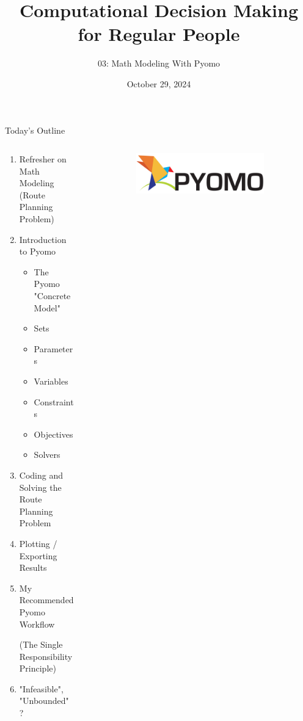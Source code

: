\documentclass[10pt, aspectratio=169]{beamer}
\title{Computational Decision Making for Regular People}
\subtitle{03: Math Modeling With Pyomo}
\date{October 29, 2024}
\begin{document}
\begin{frame}
    \maketitle
\end{frame}

\begin{frame}{Today's Outline}
    \begin{columns}
        \begin{column}{0.5\textwidth}
            \begin{enumerate}
                \item Refresher on Math Modeling (Route Planning Problem)
                \item Introduction to Pyomo
                \begin{itemize}
                    \item The Pyomo "ConcreteModel"
                    \item Sets
                    \item Parameters
                    \item Variables
                    \item Constraints
                    \item Objectives
                    \item Solvers
                \end{itemize}
                \item Coding and Solving the Route Planning Problem
                \item Plotting / Exporting Results
                \item My Recommended Pyomo Workflow
                
                (The Single Responsibility Principle)
                \item "Infeasible", "Unbounded" ?
            \end{enumerate}
        \end{column}
        \begin{column}{0.5\textwidth}
            \begin{figure}
                \begin{figure}
                    \includegraphics[width=0.95\linewidth]{PyomoLogo.png}
                \end{figure}
            \end{figure}
        \end{column}
    \end{columns}
\end{frame}
\end{document}
